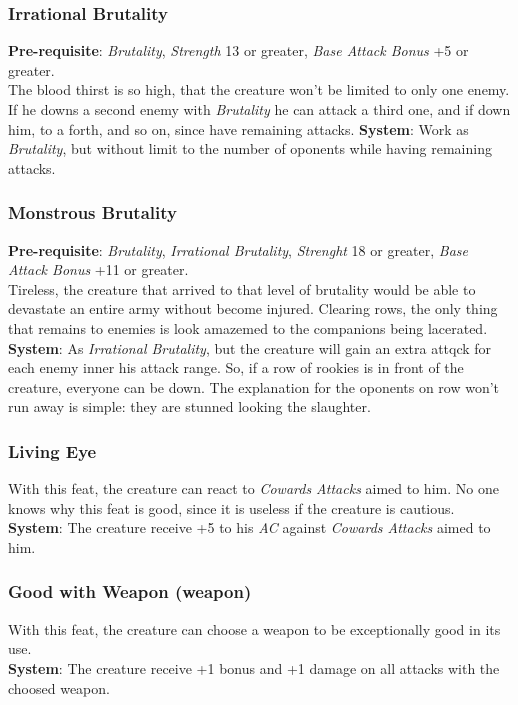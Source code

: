 \documentclass[ letterpaper,12pt]{article}
\begin{document}
\subsubsection{Irrational Brutality}
{\bf Pre-requisite}: {\it Brutality}, {\it Strength} 13 or greater, {\it Base Attack Bonus} +5 or greater.\\
The blood thirst is so high, that the creature won't be limited to only one enemy. If he downs a second enemy with {\it Brutality} he can attack a third one, and if down him, to a forth, and so on, since have remaining attacks.
{\bf System}: Work as {\it Brutality}, but without limit to the number of oponents while having remaining attacks.

\subsubsection{Monstrous Brutality}
{\bf Pre-requisite}: {\it Brutality}, {\it Irrational Brutality}, {\it Strenght} 18 or greater, {\it Base Attack Bonus} +11 or greater.\\
Tireless, the creature that arrived to that level of brutality would be able to devastate an entire army without become injured. Clearing rows, the only thing that remains to enemies is look amazemed to the companions being lacerated. \\
{\bf System}: As {\it Irrational Brutality}, but the creature will gain an extra attqck for each enemy inner his attack range. So, if a row of rookies is in front of the creature, everyone can be down. The explanation for the oponents on row won't run away is simple: they are stunned looking the slaughter.

\subsubsection{Living Eye}
With this feat, the creature can react to {\it Cowards Attacks} aimed to him. No one knows why this feat is good, since it is useless if the creature is cautious.\\
{\bf System}: The creature receive +5 to his {\it AC} against {\it Cowards Attacks} aimed to him.

\subsubsection{Good with Weapon (weapon)}
With this feat, the creature can choose a weapon to be exceptionally good in its use.\\
{\bf System}: The creature receive +1 bonus and +1 damage on all attacks with the choosed weapon.
\end{document}
